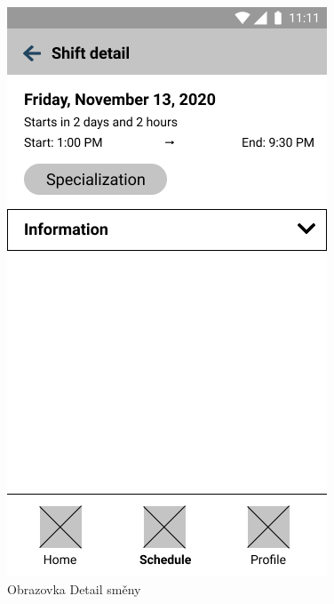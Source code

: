 \documentclass[twoside]{ctuthesis}
\begin{document}
\begin{figure}[h!]
	\includegraphics[scale=.35]{img/shift-detail.png}
	\caption{Obrazovka Detail směny}
	\label{fig:shift-detail}
\end{figure}
\end{document}
